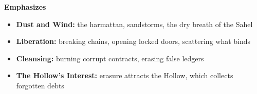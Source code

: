 \noindent\textbf{Emphasizes}
\begin{itemize}
  \item \textbf{Dust and Wind:} the harmattan, sandstorms, the dry breath of the Sahel
  \item \textbf{Liberation:} breaking chains, opening locked doors, scattering what binds
  \item \textbf{Cleansing:} burning corrupt contracts, erasing false ledgers
  \item \textbf{The Hollow's Interest:} erasure attracts the Hollow, which collects forgotten debts
\end{itemize}